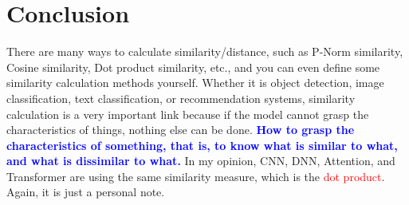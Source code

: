 \documentclass[oneside]{book}
\begin{document}
\section{Conclusion}
There are many ways to calculate similarity/distance, such as P-Norm similarity, Cosine similarity, Dot product similarity, etc., and you can even define some similarity calculation methods yourself.
Whether it is object detection, image classification, text classification, or recommendation systems, similarity calculation is a very important link because if the model cannot grasp the characteristics of things, nothing else can be done.
\textbf{\textcolor{blue}{How to grasp the characteristics of something, that is, to know what is similar to what, and what is dissimilar to what.}} 
In my opinion, CNN, DNN, Attention, and Transformer are using the same similarity measure, which is the \textcolor{red}{dot product}. Again, it is just a personal note. 
\end{document}
